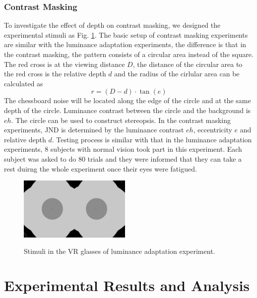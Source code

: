 \documentclass[journal]{IEEEtran}
\begin{document}
\subsubsection{Contrast Masking}
To investigate the effect of depth on contrast masking, we designed the experimental stimuli as Fig. \ref{fig:ContrastSketch}. The basic setup of contrast masking experiments are similar with the luminance adaptation experiments, the difference is that in the contrast masking, the pattern consists of a circular area instead of the square. The red cross is at the viewing distance $D$, the distance of the circular area to the red cross is the relative depth $d$ and the radius of the cirlular area can be calculated as
\begin{equation}
r=\left ( D-d \right )\cdot \tan \left ( e \right )
\end{equation}
The chessboard noise will be located along the edge of the circle and at the same depth of the circle. Luminance contrast between the circle and the background is $eh$. The circle can be used to construct stereopsis. In the contrast masking experiments, JND is determined by the luminance contrast $eh$, eccentricity $e$ and relative depth $d$. Testing process is similar with that in the luminance adaptation experiments, 8 subjects with normal vision took part in this experiment. Each subject was asked to do 80 trials and they were informed that they can take a rest duirng the whole experiment once their eyes were fatigued.
\begin{figure}[!t]
	\centering
	\includegraphics[width=0.48\textwidth]{ContrastSketch}\\
	\caption{Stimuli in the VR glasses of luminance adaptation experiment.}
	\label{fig:ContrastSketch} 
\end{figure}
\section{Experimental Results and Analysis}
\end{document}
